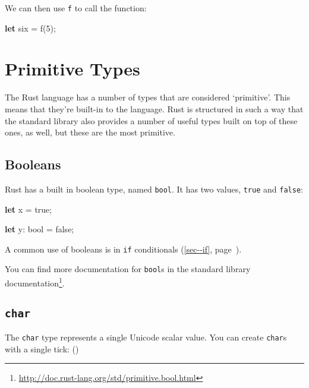 \documentclass[a4paper,]{book}
\renewcommand*{\hyperref}[2][\ar]{%
  \def\ar{#2}%
  #2 (\autoref{#1}, page~\pageref{#1})}
\newenvironment{Shaded}{\begin{snugshade}}{\end{snugshade}}
\newcommand{\KeywordTok}[1]{\textcolor[rgb]{0.13,0.29,0.53}{\textbf{{#1}}}}
\newcommand{\DataTypeTok}[1]{\textcolor[rgb]{0.13,0.29,0.53}{{#1}}}
\newcommand{\DecValTok}[1]{\textcolor[rgb]{0.00,0.00,0.81}{{#1}}}
\newcommand{\ConstantTok}[1]{\textcolor[rgb]{0.00,0.00,0.00}{{#1}}}
\newcommand{\NormalTok}[1]{{#1}}
\renewcommand{\href}[2]{#2\footnote{\url{#1}}}
\begin{document}
We can then use \texttt{f} to call the function:

\begin{Shaded}
\begin{Highlighting}[]
\KeywordTok{let} \NormalTok{six = f(}\DecValTok{5}\NormalTok{);}
\end{Highlighting}
\end{Shaded}

\section{Primitive Types}\label{sec--primitive-types}

The Rust language has a number of types that are considered `primitive'.
This means that they're built-in to the language. Rust is structured in
such a way that the standard library also provides a number of useful
types built on top of these ones, as well, but these are the most
primitive.

\subsection{Booleans}\label{booleans}

Rust has a built in boolean type, named \texttt{bool}. It has two
values, \texttt{true} and \texttt{false}:

\begin{Shaded}
\begin{Highlighting}[]
\KeywordTok{let} \NormalTok{x = }\ConstantTok{true}\NormalTok{;}

\KeywordTok{let} \NormalTok{y: }\DataTypeTok{bool} \NormalTok{= }\ConstantTok{false}\NormalTok{;}
\end{Highlighting}
\end{Shaded}

A common use of booleans is in \hyperref[sec--if]{\texttt{if}
conditionals}.

You can find more documentation for \texttt{bool}s
\href{http://doc.rust-lang.org/std/primitive.bool.html}{in the standard
library documentation}.

\subsection{\texorpdfstring{\texttt{char}}{char}}\label{char}

The \texttt{char} type represents a single Unicode scalar value. You can
create \texttt{char}s with a single tick: (\texttt{\textquotesingle{}})
\end{document}
